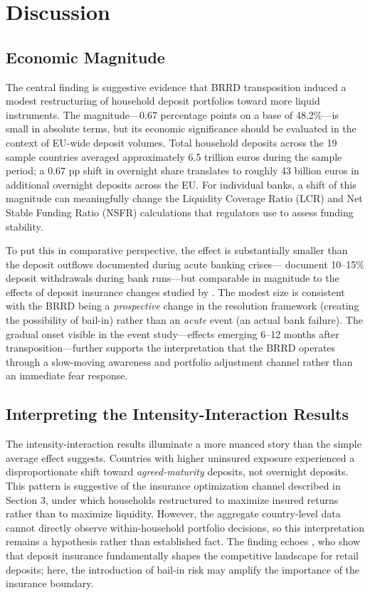 \documentclass[12pt]{article}
\begin{document}
\section{Discussion}

\subsection{Economic Magnitude}

The central finding is suggestive evidence that BRRD transposition induced a modest restructuring of household deposit portfolios toward more liquid instruments. The magnitude---0.67 percentage points on a base of 48.2\%---is small in absolute terms, but its economic significance should be evaluated in the context of EU-wide deposit volumes. Total household deposits across the 19 sample countries averaged approximately 6.5 trillion euros during the sample period; a 0.67 pp shift in overnight share translates to roughly 43 billion euros in additional overnight deposits across the EU. For individual banks, a shift of this magnitude can meaningfully change the Liquidity Coverage Ratio (LCR) and Net Stable Funding Ratio (NSFR) calculations that regulators use to assess funding stability.

To put this in comparative perspective, the effect is substantially smaller than the deposit outflows documented during acute banking crises---\citet{iyer2012understanding} document 10--15\% deposit withdrawals during bank runs---but comparable in magnitude to the effects of deposit insurance changes studied by \citet{demirguc2004deposit}. The modest size is consistent with the BRRD being a \textit{prospective} change in the resolution framework (creating the possibility of bail-in) rather than an \textit{acute} event (an actual bank failure). The gradual onset visible in the event study---effects emerging 6--12 months after transposition---further supports the interpretation that the BRRD operates through a slow-moving awareness and portfolio adjustment channel rather than an immediate fear response.

\subsection{Interpreting the Intensity-Interaction Results}

The intensity-interaction results illuminate a more nuanced story than the simple average effect suggests. Countries with higher uninsured exposure experienced a disproportionate shift toward \textit{agreed-maturity} deposits, not overnight deposits. This pattern is suggestive of the insurance optimization channel described in Section 3, under which households restructured to maximize insured returns rather than to maximize liquidity. However, the aggregate country-level data cannot directly observe within-household portfolio decisions, so this interpretation remains a hypothesis rather than established fact. The finding echoes \citet{egan2017deposit}, who show that deposit insurance fundamentally shapes the competitive landscape for retail deposits; here, the introduction of bail-in risk may amplify the importance of the insurance boundary.
\end{document}
